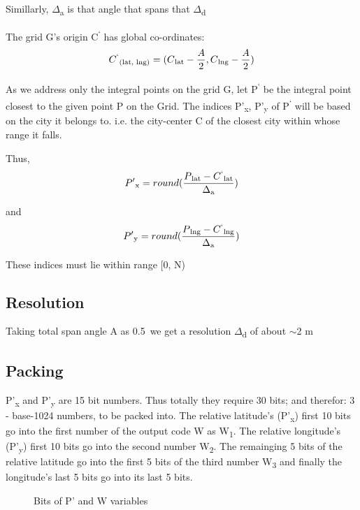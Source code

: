 \documentclass[conference]{IEEEtran}
\begin{document}
Simillarly, $\Delta$\textsubscript{a} is that angle that spans that $\Delta$\textsubscript{d}

The grid G's origin C\textsuperscript{`} has global co-ordinates:
\begin{equation}C\textsuperscript{`}\textsubscript{(lat, lng)} = ( C\textsubscript{lat} - \frac{A}{2}, C\textsubscript{lng} - \frac{A}{2})\end{equation}

As we address only the integral points on the grid G, let P\textsuperscript{`} be the integral point closest to the given point P on the Grid.
The indices P'\textsubscript{x}, P'\textsubscript{y} of P\textsuperscript{`} will be based on the city it belongs to.
i.e. the city-center C of the closest city within whose range it falls.


Thus, \begin{equation}P'\textsubscript{x} = round(\frac{P\textsubscript{lat} - C\textsuperscript{`}\textsubscript{lat}}{\Delta\textsubscript{a}})\end{equation}

and \begin{equation}P'\textsubscript{y}= round(\frac{P\textsubscript{lng} - C\textsuperscript{`}\textsubscript{lng}}{\Delta\textsubscript{a}})\end{equation}

These indices must lie within range [0, N)

\subsection{Resolution}
Taking total span angle A as 0.5\degree\ we get a resolution $\Delta$\textsubscript{d} of about $\sim$2 m

\subsection{Packing}
P'\textsubscript{x} and P'\textsubscript{y} are 15 bit numbers.
Thus totally they require 30 bits; and therefor: 3 - base-1024 numbers, to be packed into.
The relative latitude's (P'\textsubscript{x}) first 10 bits go into the first number of the output code W as W\textsubscript{1}. The relative longitude's (P'\textsubscript{y}) first 10 bits go into the second number W\textsubscript{2}. The remainging 5 bits of the relative latitude go into the first 5 bits of the third number W\textsubscript{3} and finally the longitude's last 5 bits go into its last 5 bits.
\begin{figure}[htbp]
\centerline{}
\caption{Bits of P' and W variables}
\label{Packing}
\end{figure}
\end{document}
